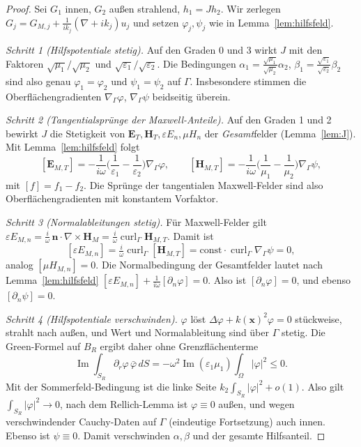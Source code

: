 \documentclass[11pt, a4paper]{article}
\newcommand{\mvec}[1]{\boldsymbol{#1}}
\newcommand{\n}{\mvec{n}}
\theoremstyle{plain}
\theoremstyle{definition}
\begin{document}
\begin{proof}
Sei $G_1$ innen, $G_2$ außen strahlend, $h_1=Jh_2$. Wir zerlegen
$G_j = G_{M,j} + \frac1{ik_j}(\nabla+ik_j)u_j$ und setzen $\varphi_j,\psi_j$ wie in
Lemma~\ref{lem:hilfsfeld}.

\emph{Schritt 1 (Hilfspotentiale stetig).} Auf den Graden 0 und 3 wirkt $J$ mit den
Faktoren $\sqrt{\mu_1}/\sqrt{\mu_2}$ und $\sqrt{\varepsilon_1}/\sqrt{\varepsilon_2}$.
Die Bedingungen $\alpha_1 = \frac{\sqrt{\mu_1}}{\sqrt{\mu_2}}\alpha_2$,
$\beta_1 = \frac{\sqrt{\varepsilon_1}}{\sqrt{\varepsilon_2}}\beta_2$ sind also genau
$\varphi_1=\varphi_2$ und $\psi_1=\psi_2$ auf $\Gamma$. Insbesondere stimmen die
Oberflächengradienten $\nabla_\Gamma\varphi$, $\nabla_\Gamma\psi$ beidseitig überein.

\emph{Schritt 2 (Tangentialsprünge der Maxwell-Anteile).} Auf den Graden 1 und 2
bewirkt $J$ die Stetigkeit von $\mvec{E}_T,\mvec{H}_T,\varepsilon E_n,\mu H_n$ der
\emph{Gesamt}felder (Lemma~\ref{lem:J}). Mit Lemma~\ref{lem:hilfsfeld} folgt
\[
  [\mvec{E}_{M,T}] = -\frac{1}{i\omega}\Big(\frac1{\varepsilon_1}-\frac1{\varepsilon_2}\Big)\nabla_\Gamma\varphi,
  \qquad
  [\mvec{H}_{M,T}] = -\frac{1}{i\omega}\Big(\frac1{\mu_1}-\frac1{\mu_2}\Big)\nabla_\Gamma\psi,
\]
mit $[f]=f_1-f_2$. Die Sprünge der tangentialen Maxwell-Felder sind also
Oberflächengradienten mit konstantem Vorfaktor.

\emph{Schritt 3 (Normalableitungen stetig).} Für Maxwell-Felder gilt
$\varepsilon E_{M,n} = \frac{i}{\omega}\,\n\cdot\nabla\times\mvec{H}_M =
\frac{i}{\omega}\operatorname{curl}_\Gamma\mvec{H}_{M,T}$. Damit ist
\[
  [\varepsilon E_{M,n}] = \tfrac{i}{\omega}\operatorname{curl}_\Gamma[\mvec{H}_{M,T}]
  = \text{const}\cdot\operatorname{curl}_\Gamma\nabla_\Gamma\psi = 0,
\]
analog $[\mu H_{M,n}]=0$. Die Normalbedingung der Gesamtfelder lautet nach
Lemma~\ref{lem:hilfsfeld}
$[\varepsilon E_{M,n}] + \frac{1}{i\omega}[\partial_n\varphi] = 0$. Also ist
$[\partial_n\varphi]=0$, und ebenso $[\partial_n\psi]=0$.

\emph{Schritt 4 (Hilfspotentiale verschwinden).} $\varphi$ löst
$\Delta\varphi+k(\mvec{x})^2\varphi=0$ stückweise, strahlt nach außen, und Wert und
Normalableitung sind über $\Gamma$ stetig. Die Green-Formel auf $B_R$ ergibt daher ohne
Grenzflächenterme
\[
  \operatorname{Im}\int_{S_R}\partial_r\varphi\,\bar\varphi\,dS
  = -\omega^2\operatorname{Im}(\varepsilon_1\mu_1)\int_\Omega|\varphi|^2 \le 0 .
\]
Mit der Sommerfeld-Bedingung ist die linke Seite
$k_2\int_{S_R}|\varphi|^2+o(1)$. Also gilt $\int_{S_R}|\varphi|^2\to0$, nach dem
Rellich-Lemma ist $\varphi\equiv0$ außen, und wegen verschwindender Cauchy-Daten auf
$\Gamma$ (eindeutige Fortsetzung) auch innen. Ebenso ist $\psi\equiv0$. Damit
verschwinden $\alpha,\beta$ und der gesamte Hilfsanteil.


\end{proof}
\end{document}
